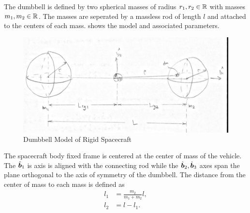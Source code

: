 The dumbbell is defined by two spherical masses of radius \( r_1, r_2 \in \mathbb{R} \) with masses \( m_1, m_2 \in \mathbb{R}\).
The masses are seperated by a massless rod of length \( l \) and attached to the centers of each mass.
 shows the model and associated parameters.
\begin{figure}[htbp]
    \centering
    \includegraphics[width=\textwidth]{figures/dumbbell.png}
    \caption{Dumbbell Model of Rigid Spacecraft}
    \label{fig:dumbbell_sc}
\end{figure}
The spacecraft body fixed frame is centered at the center of mass of the vehicle.
The \( \hat{\bm{b}}_1 \) is axis is aligned with the connecting rod while the \( \hat{\bm{b}}_2, \hat{\bm{b}}_3 \) axes span the plane orthogonal to the axis of symmetry of the dumbbell.
The distance from the center of mass to each mass is defined as
\begin{align}\label{eq:dumbbell_mass_distances}
    l_1 &= \frac{m_2}{m_1 + m_2} l, \\
    l_2 &= l - l_1.
\end{align}

